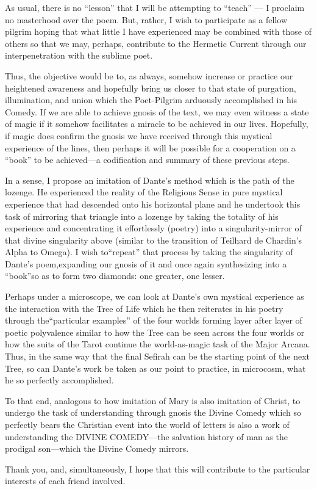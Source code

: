 As usual, there is no ``lesson'' that I will be attempting to ``teach'' --- I proclaim no masterhood over the poem. But, rather, I wish to participate as a fellow pilgrim hoping that what little I have experienced may be combined with those of others so that we may, perhaps, contribute to the Hermetic Current through our interpenetration with the sublime poet.

Thus, the objective would be to, as always, somehow increase or practice our heightened awareness and hopefully bring us closer to that state of purgation, illumination, and union which the Poet-Pilgrim arduously accomplished in his Comedy. If we are able to achieve gnosis of the text, we may even witness a state of magic if it somehow facilitates a miracle to be achieved in our lives. Hopefully, if magic does confirm the gnosis we have received through this mystical experience of the lines, then perhaps it will be possible for a cooperation on a ``book'' to be achieved---a codification and summary of these previous steps.

In a sense, I propose an imitation of Dante's method which is the path of the lozenge. He experienced the reality of the Religious Sense in pure mystical experience that had descended onto his horizontal plane and he undertook this task of mirroring that triangle into a lozenge by taking the totality of his experience and concentrating it effortlessly (poetry) into a singularity-mirror of that divine singularity above (similar to the transition of Teilhard de Chardin's Alpha to Omega). I wish to``repeat'' that process by taking the singularity of Dante's poem,expanding our gnosis of it and once again synthesizing into a ``book''so as to form two diamonds: one greater, one lesser.

Perhaps under a microscope, we can look at Dante's own mystical experience as the interaction with the Tree of Life which he then reiterates in his poetry through the``particular examples'' of the four worlds forming layer after layer of poetic polyvalence similar to how the Tree can be seen across the four worlds or how the suits of the Tarot continue the world-as-magic task of the Major Arcana. Thus, in the same way that the final Sefirah can be the starting point of the next Tree, so can Dante's work be taken as our point to practice, in microcosm, what he so perfectly accomplished.

To that end, analogous to how imitation of Mary is also imitation of Christ, to undergo the task of understanding through gnosis the Divine Comedy which so perfectly bears the Christian event into the world of letters is also a work of understanding the DIVINE COMEDY---the salvation history of man as the prodigal son---which the Divine Comedy mirrors.

Thank you, and, simultaneously, I hope that this will contribute to the particular interests of each friend involved.



